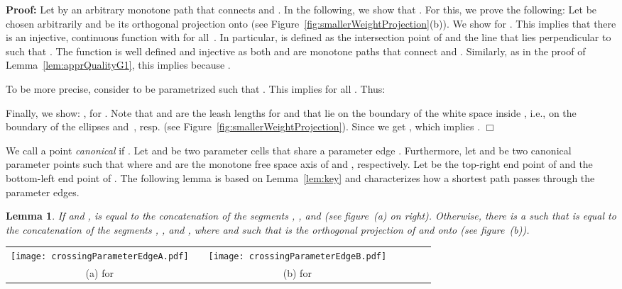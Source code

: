 \documentclass[a4paper,11pt]{article}
\newtheorem{lemma}{Lemma}
\newenvironment{proof}{\textbf{Proof:}}{\hspace*{0mm}\hfill\ensuremath{\Box}}
\begin{document}
\begin{proof} Let  by an arbitrary monotone path that connects  and . In the following, we show that . For this, we prove the following: Let  be chosen arbitrarily and   be its orthogonal projection onto  (see Figure~\ref{fig:smallerWeightProjection}(b)). We show  for . This implies that there is an injective, continuous function  with  for all~. In particular,  is defined as the intersection point of  and the line  that lies perpendicular to  such that . The function  is well defined and injective as both  and  are monotone paths that connect  and . Similarly, as in the proof of Lemma~\ref{lem:apprQualityG1}, this implies  because .

	To be more precise, consider  to be parametrized such that . This implies  for all . Thus:
	
	
	Finally, we show:  , for . Note that  and  are the leash lengths for   and  that lie on the boundary of the white space inside , i.e., on the boundary of the ellipses  and~, resp. (see Figure~\ref{fig:smallerWeightProjection}). Since  we get , which implies .
\end{proof}

	We call a point  \emph{canonical} if . Let  and  be two parameter cells that share a parameter edge . Furthermore, let   and  be two canonical parameter points such that  where  and  are the monotone free space axis of  and , respectively. Let  be the top-right end point of  and  the bottom-left end point of . The following lemma is based on Lemma~\ref{lem:key} and characterizes how a shortest path passes through the parameter edges.\\ 

\noindent\begin{minipage}{0.5\linewidth}\vspace*{0.5ex}
\begin{lemma}\label{lem:canonicalOneVertex} If  and ,  is equal to the concatenation of the segments , , and   (see figure~(a) on right). Otherwise, there is a  such that  is equal to the concatenation of the segments , , and , where  and  such that  is the orthogonal projection of  and  onto  (see figure~(b)).
\end{lemma}
\end{minipage}
\begin{minipage}{0.4\linewidth}
\begin{center}
    \begin{tabular}{ccccccc}
      \texttt{[image: crossingParameterEdgeA.pdf]} & &
       \texttt{[image: crossingParameterEdgeB.pdf]}&&\\ 
{\small (a)  for } & &
      {\small (b)  for }&&
    \end{tabular}
  \end{center}
\end{minipage} 
\\ 
\end{document}
